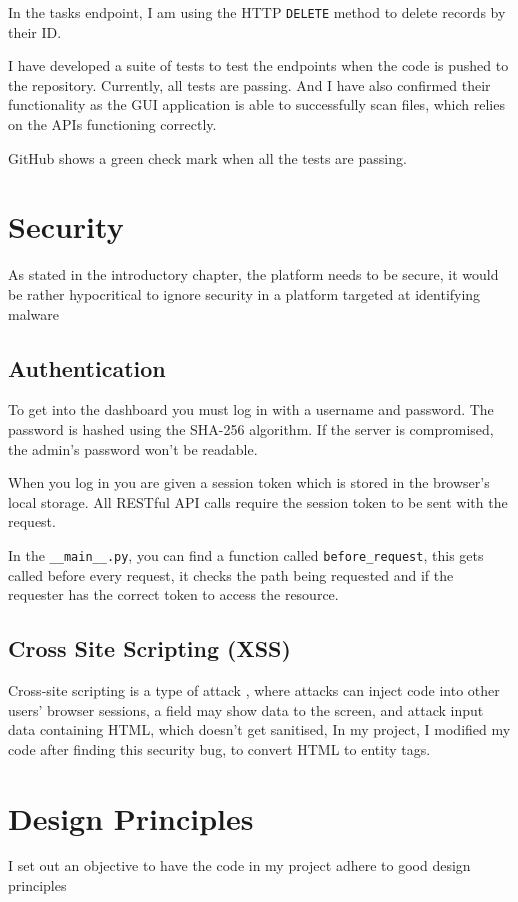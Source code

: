 In the tasks endpoint, I am using the HTTP \texttt{DELETE}
method to delete records by their ID.

I have developed a suite of tests to test
the endpoints when the code is pushed to the repository.
Currently, all tests are passing. And I have also confirmed their functionality
as the GUI application is able to successfully scan files,
which relies on the APIs functioning correctly.

GitHub shows a green check mark when all the tests are passing.

\section{Security}
As stated in the introductory chapter, the platform needs to be secure,
it would be rather hypocritical to ignore security in a
platform targeted at identifying malware

\subsection{Authentication}
To get into the dashboard you must log in with a username and password.
The password is hashed using the SHA-256 algorithm.
If the server is compromised, the admin's password won't be readable.

When you log in you are given a session token which is stored in the browser's local storage.
All RESTful API calls require the session token to be sent with the request.

In the \texttt{\_\_main\_\_.py}, you can find a function
called \texttt{before\_request},
this gets called before every request, it checks the path being requested
and if the requester has the correct token to access the resource.

\subsection{Cross Site Scripting (XSS)}
Cross-site scripting is a type of attack \cite{XSS},
where attacks can inject code into other users' browser sessions,
a field may show data to the screen, and attack input data containing HTML,
which doesn't get sanitised, In my project, I modified my code
after finding this security bug, to convert HTML to entity tags. 

\section {Design Principles}
I set out an objective to have the code in my project
adhere to good design principles

